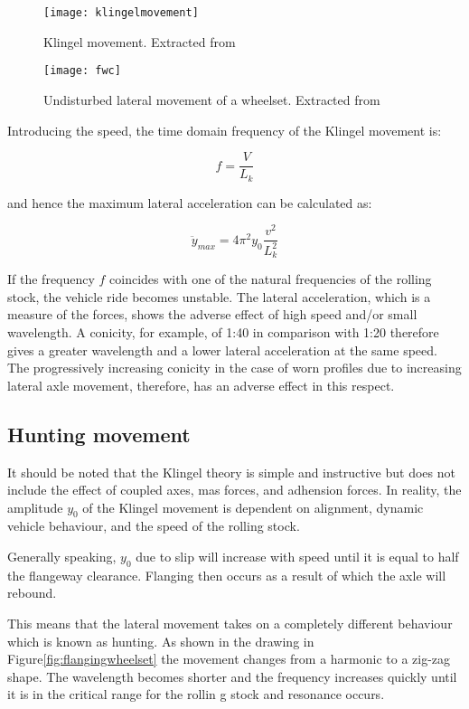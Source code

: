 \begin{figure}[h]
	\centering
	\texttt{[image: klingelmovement]}
	\caption{Klingel movement. Extracted from \cite[Figure 2.3]{esveld2001modern}}
	\label{fig:klingelmovement}
\end{figure}

\begin{figure}[h]
	\centering
	\texttt{[image: fwc]}
	\caption{Undisturbed lateral movement of a wheelset. Extracted from \cite[Figure 2.4]{esveld2001modern}}
	\label{fig:fwc}
\end{figure}

Introducing the speed, the time domain frequency of the Klingel movement is:

$$ f = \frac{V}{L_k} $$

and hence the maximum lateral acceleration can be calculated as:

$$\ddot{y}_{max} = 4\pi^2y_0\frac{v^2}{L_k^2}$$

If the frequency $f$ coincides with one of the natural frequencies of the rolling stock, the vehicle ride becomes unstable. The lateral acceleration, which is a measure of the forces, shows the adverse effect of high speed and/or small wavelength. A conicity, for example, of 1:40 in comparison with 1:20 therefore gives a greater wavelength and a lower lateral acceleration at the same speed. The progressively increasing conicity in the case of worn profiles due to increasing lateral axle movement, therefore, has an adverse effect in this respect.

\subsection{Hunting movement}

It should be noted that the Klingel theory is simple and instructive but does not include the effect of coupled axes, mas forces, and adhension forces. In reality, the amplitude $y_0$ of the Klingel movement is dependent on alignment, dynamic vehicle behaviour, and the speed of the rolling stock. 

Generally speaking, $y_0$ due to slip will increase with speed until it is equal to half the flangeway clearance. Flanging then occurs as a result of which the axle will rebound. 

This means that the lateral movement takes on a completely different behaviour which is known as hunting. As shown in the drawing in Figure\ref{fig:flangingwheelset} the movement changes from a harmonic to a zig-zag shape. The wavelength becomes shorter and the frequency increases quickly until it is in the critical range for the rollin g stock and resonance occurs.

